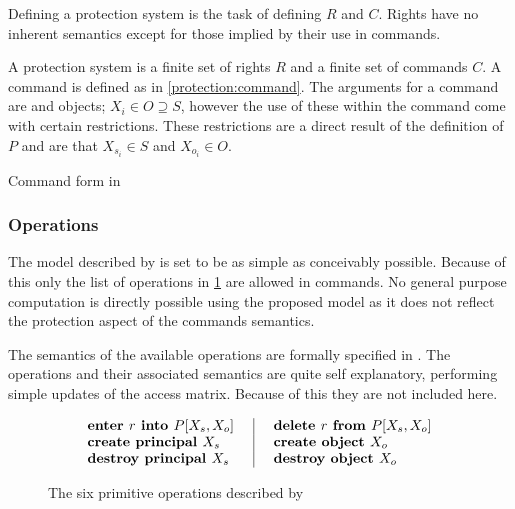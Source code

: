Defining a protection system is the task of defining $R$ and $C$.
Rights have no inherent semantics except for those implied by their use in commands.

\begin{definition}
A protection system is a finite set of rights $R$ and a finite set of commands $C$.
A command is defined as in \cref{protection:command}. 
The arguments for a command are \subjects{} and objects; $X_i \in O \supseteq S$, however the use of these within the command come with certain restrictions.
These restrictions are a direct result of the definition of $P$ and are that $X_{s_i} \in S$ and $X_{o_i} \in O$.
\end{definition}

\begin{algorithm}
  \DontPrintSemicolon
  \cmd {} 
  \caption{Command form in \cite{HRU}\label{protection:command}}
\end{algorithm}

\subsubsection{Operations}
The model described by \citet{HRU} is set to be as simple as conceivably possible.
Because of this only the list of operations in \cref{protection:operations} are allowed in commands.
No general purpose computation is directly possible using the proposed model as it does not reflect the protection aspect of the commands semantics.

The semantics of the available operations are formally specified in \citet[p. 463]{HRU}.
The operations and their associated semantics are quite self explanatory, performing simple updates of the access matrix.
Because of this they are not included here.

\begin{figure}
 \centering
 \[\arraycolsep=14pt%
 \begin{array}{l|l}
  \textbf{enter } r \textbf{ into } P[X_s, X_o] & \textbf{delete } r \textbf{ from } P[X_s, X_o]\\
  \textbf{create \subject{} } X_s & \textbf{create object } X_o\\
  \textbf{destroy \subject{} } X_s & \textbf{destroy object } X_o
 \end{array}
 \]
 \caption{The six primitive operations described by \cite{HRU}}
 \label{protection:operations}
\end{figure}

